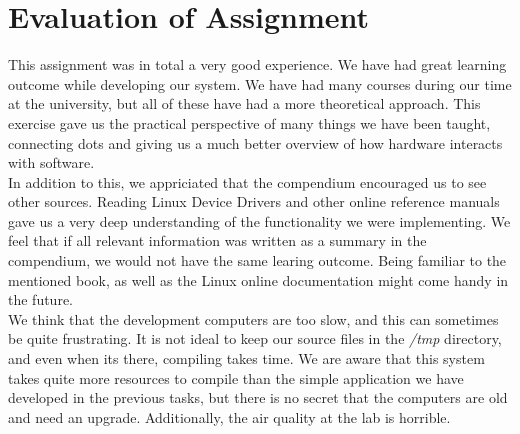 \section{Evaluation of Assignment}
This assignment was in total a very good experience. We have had great learning outcome while developing our system. We have had many courses during our time at the university, but all of these have had a more theoretical approach. This exercise gave us the practical perspective of many things we have been taught, connecting dots and giving us a much better overview of how hardware interacts with software. \\

In addition to this, we appriciated that the compendium encouraged us to see other sources. Reading Linux Device Drivers and other online reference manuals gave us a very deep understanding of the functionality we were implementing. We feel that if all relevant information was written as a summary in the compendium, we would not have the same learing outcome. Being familiar to the mentioned book, as well as the Linux online documentation might come handy in the future. \\

We think that the development computers are too slow, and this can sometimes be quite frustrating. It is not ideal to keep our source files in the \emph{/tmp} directory, and even when its there, compiling takes time. We are aware that this system takes quite more resources to compile than the simple application we have developed in the previous tasks, but there is no secret that the computers are old and need an upgrade. Additionally, the air quality at the lab is horrible.
